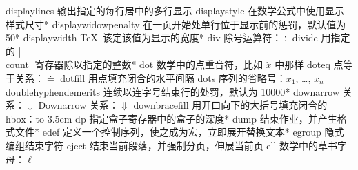 \capcs displaylines {输出指定的每行居中的多行显示}{}{}
\capcs displaystyle {在数学公式中使用显示样式尺寸}*{}
\capcs displaywidowpenalty {在一页开始处单行位于显示前的惩罚，默认值为 50}*{}
\capcs displaywidth {\TeX\ 该定该值为显示的宽度}*{}
\capcs div {除号运算符：$\div$}{}{}
\capcs divide {用指定的 |\\count| 寄存器除以指定的整数}*{}
\capcs dot {数学中的点重音符，比如 $\dot x$ 中那样}{}{}
\capcs doteq {点等于关系：$\doteq$}{}{}
\capcs dotfill {用点填充闭合的水平间隔}{}{}
\capcs dots {序列的省略号：$x_1$, \dots, $x_n$}{}{}
\capcs doublehyphendemerits {连续以连字号结束行的处罚，默认为 10000}*{}
\capcs downarrow {关系：$\downarrow$}{}{}
\capcs Downarrow {关系：$\Downarrow$}{}{}
\capcs downbracefill {用开口向下的大括号填充闭合的 hbox：\hbox to 3.5em{\downbracefill}}{}{}
\capcs dp {指定盒子寄存器中的盒子的深度}*{}
\capcs dump {结束作业，并产生格式文件}*{}
\capcs edef {定义一个控制序列，使之成为宏，立即展开替换文本}*{}
\capcs egroup {隐式编组结束字符}{}{}
\capcs eject {结束当前段落，并强制分页，伸展当前页}{}{}
\capcs ell {数学中的草书字母：$\ell$}{}{}
